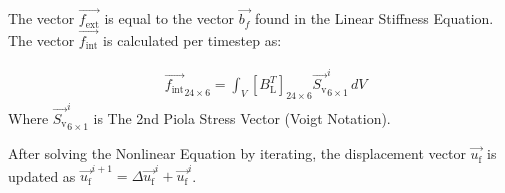 \documentclass{article}
\begin{document}
\noindent The vector $\vec{f_{\text{ext}}}$ is equal to the vector $\vec{b_{f}}$ found in the Linear Stiffness Equation. The vector $\vec{f_{\text{int}}}$ is calculated per timestep as:

\begin{align}
     & \vec{f_{\text{int}}}_{24\times6}
    =\int_{V}{
    {\left[B_\text{L}^T\right]}_{24\times6}
    \vec{S_{\text{v}}}^i_{6\times1}
    \,dV}
    \nonumber
\end{align}
Where $\vec{S_{\text{v}}}^i_{6\times1}$ is The 2nd Piola Stress Vector (Voigt Notation).

\noindent After solving the Nonlinear Equation by iterating, the displacement vector $\vec{u_{\text{f}}}$ is updated as $\vec{u_{\text{f}}}^{i+1} = \Delta\vec{u_{\text{f}}}^{i} + \vec{u_{\text{f}}}^{i}$.

\noindent\hrulefill{}
\end{document}
